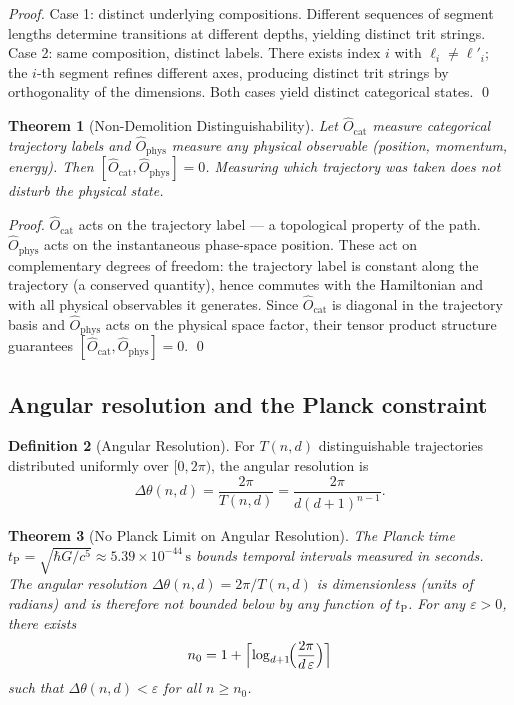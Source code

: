 \documentclass[twocolumn,10pt,a4paper]{article}
\theoremstyle{thmstyle}
\newtheorem{theorem}{Theorem}[section]
\theoremstyle{definition}
\newtheorem{definition}[theorem]{Definition}
\theoremstyle{remark}
\newcommand{\tP}{t_{\mathrm{P}}}
\begin{document}
\begin{proof}
Case 1: distinct underlying compositions. Different sequences of segment
lengths determine transitions at different depths, yielding distinct trit
strings.
Case 2: same composition, distinct labels. There exists index $i$ with
$\ell_i \neq \ell'_i$; the $i$-th segment refines different axes, producing
distinct trit strings by orthogonality of the dimensions.
Both cases yield distinct categorical states. \qed
\end{proof}

\begin{theorem}[Non-Demolition Distinguishability]
\label{thm:nondemolition}
Let $\hat{O}_{\mathrm{cat}}$ measure categorical trajectory labels and
$\hat{O}_{\mathrm{phys}}$ measure any physical observable (position, momentum,
energy). Then $[\hat{O}_{\mathrm{cat}}, \hat{O}_{\mathrm{phys}}] = 0$.
Measuring which trajectory was taken does not disturb the physical state.
\end{theorem}

\begin{proof}
$\hat{O}_{\mathrm{cat}}$ acts on the trajectory label — a topological property
of the path. $\hat{O}_{\mathrm{phys}}$ acts on the instantaneous phase-space
position. These act on complementary degrees of freedom: the trajectory label
is constant along the trajectory (a conserved quantity), hence commutes with
the Hamiltonian and with all physical observables it generates.
Since $\hat{O}_{\mathrm{cat}}$ is diagonal in the trajectory basis and
$\hat{O}_{\mathrm{phys}}$ acts on the physical space factor, their tensor
product structure guarantees $[\hat{O}_{\mathrm{cat}}, \hat{O}_{\mathrm{phys}}] = 0$.
\qed
\end{proof}

\subsection{Angular resolution and the Planck constraint}

\begin{definition}[Angular Resolution]
For $T(n,d)$ distinguishable trajectories distributed uniformly over
$[0,2\pi)$, the angular resolution is
\[
\Delta\theta(n,d) = \frac{2\pi}{T(n,d)} = \frac{2\pi}{d(d+1)^{n-1}}.
\]
\end{definition}

\begin{theorem}[No Planck Limit on Angular Resolution]
\label{thm:noplanck}
The Planck time $\tP = \sqrt{\hbar G/c^5} \approx 5.39 \times 10^{-44}\,\mathrm{s}$
bounds temporal intervals measured in seconds. The angular resolution
$\Delta\theta(n,d) = 2\pi/T(n,d)$ is dimensionless (units of radians) and
is therefore not bounded below by any function of $\tP$.
For any $\varepsilon > 0$, there exists
\[
n_0 = 1 + \Bigl\lceil \log_{d+1}\!\Bigl(\frac{2\pi}{d\,\varepsilon}\Bigr)\Bigr\rceil
\]
such that $\Delta\theta(n,d) < \varepsilon$ for all $n \geq n_0$.
\end{theorem}
\end{document}
